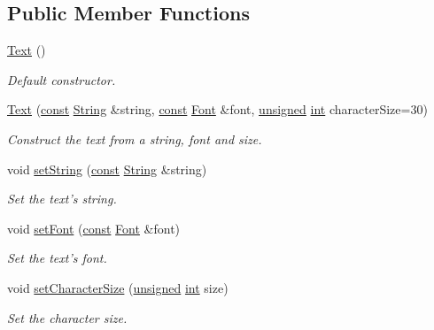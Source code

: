 \subsection*{Public Member Functions}
\begin{DoxyCompactItemize}
\item 
\hyperlink{classsf_1_1_text_aff7cab6a92e5948c9d1481cb2d87eb84}{Text} ()
\begin{DoxyCompactList}\small\item\em Default constructor. \end{DoxyCompactList}\item 
\hyperlink{classsf_1_1_text_a614019e0b5c0ed39a99d32483a51f2c5}{Text} (\hyperlink{term__entry_8h_a57bd63ce7f9a353488880e3de6692d5a}{const} \hyperlink{classsf_1_1_string}{String} \&string, \hyperlink{term__entry_8h_a57bd63ce7f9a353488880e3de6692d5a}{const} \hyperlink{classsf_1_1_font}{Font} \&font, \hyperlink{curses_8priv_8h_aca40206900cfc164654362fa8d4ad1e6}{unsigned} \hyperlink{term__entry_8h_ad65b480f8c8270356b45a9890f6499ae}{int} character\-Size=30)
\begin{DoxyCompactList}\small\item\em Construct the text from a string, font and size. \end{DoxyCompactList}\item 
void \hyperlink{classsf_1_1_text_a7d3b3359f286fd9503d1ced25b7b6c33}{set\-String} (\hyperlink{term__entry_8h_a57bd63ce7f9a353488880e3de6692d5a}{const} \hyperlink{classsf_1_1_string}{String} \&string)
\begin{DoxyCompactList}\small\item\em Set the text's string. \end{DoxyCompactList}\item 
void \hyperlink{classsf_1_1_text_a2927805d1ae92d57f15034ea34756b81}{set\-Font} (\hyperlink{term__entry_8h_a57bd63ce7f9a353488880e3de6692d5a}{const} \hyperlink{classsf_1_1_font}{Font} \&font)
\begin{DoxyCompactList}\small\item\em Set the text's font. \end{DoxyCompactList}\item 
void \hyperlink{classsf_1_1_text_ae96f835fc1bff858f8a23c5b01eaaf7e}{set\-Character\-Size} (\hyperlink{curses_8priv_8h_aca40206900cfc164654362fa8d4ad1e6}{unsigned} \hyperlink{term__entry_8h_ad65b480f8c8270356b45a9890f6499ae}{int} size)
\begin{DoxyCompactList}\small\item\em Set the character size. \end{DoxyCompactList}\item 

\end{DoxyCompactItemize}
